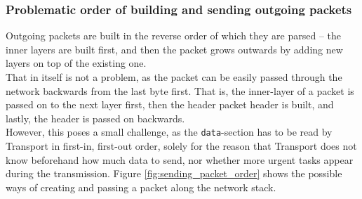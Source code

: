 \subsubsection{Problematic order of building and sending outgoing packets}
Outgoing packets are built in the reverse order of which they are parsed -- the 
inner layers are built first, and then the packet grows outwards by adding new 
layers on top of the existing one.\\
That in itself is not a problem, as the packet can be easily passed through the 
network backwards from the last byte first. That is, the inner-layer of a packet
is passed on to the next layer first, then the header packet header is built, 
and lastly, the header is passed on backwards.\\
However, this poses a small challenge, as the \texttt{data}-section has to be 
read by Transport in first-in, first-out order, solely for the reason that 
Transport does not know beforehand how much data to send, nor whether more urgent 
tasks appear during the transmission.
Figure \ref{fig:sending_packet_order} shows the possible ways of creating and 
passing a packet along the network stack. 
